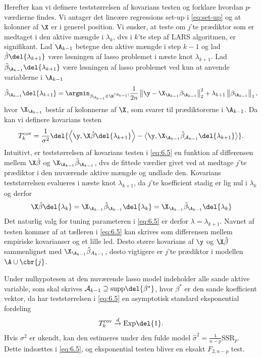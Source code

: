 Herefter kan vi definere teststørrelsen af kovarians testen og forklare hvordan \(p\)-værdierne findes.
Vi antager det lineære regressions set-up i \eqref{eq:set-up} og at kolonner af \(\X\) er i generel position.
Vi ønsker, at teste om \(j\)'te prædiktor som er medtaget i den aktive mængde i \(\lambda_k\), dvs i \(k\)'te step af LARS algoritmen, er signifikant.
Lad \(\A_{k-1}\) betegne den aktive mængde i step \(k-1\) og lad \(\hat{\beta} \del{\lambda_{k+1}}\) være løsningen af lasso problemet i næste knot \(\lambda_{k+1}\).
Lad \(\tilde{\beta}_{\A_{k-1}} \del{\lambda_{k+1}}\) være løsningen af lasso problemet ved kun at anvende variablerne i \(\A_{k-1}\)
\begin{align*}
\tilde{\beta}_{\A_{k-1}} \del{\lambda_{k+1}} = \argmin_{\beta_{\A_{k-1}} \in \R^{\vert \A_{k-1} \vert}} \frac{1}{2n} \left\Vert \y - \X_{\A_{k-1}} \beta_{\A_{k-1}} \right\Vert_2^2 + \lambda_{k+1} \left\Vert \beta_{\A_{k-1}} \right\Vert_1,
\end{align*}
hvor \(\X_{\A_{k-1}}\) består af kolonnerne af \(\X\), som svarer til prædiktorerne i \(\A_{k-1}\).
Da kan vi definere kovarians testen
\begin{align}
T_k^\text{cov} = \frac{1}{\sigma^2} \del{ \left\langle \y, \X \hat{\beta} \del{\lambda_{k+1}} \right\rangle - \left\langle  \y, \X_{\A_{k-1}} \tilde{\beta}_{\mathcal{A}_{k-1}} \del{\lambda_{k+1}} \right\rangle}. \label{eq:6.5}
\end{align}
Intuitivt, er teststørrelsen af kovarians testen i \eqref{eq:6.5} en funktion af differensen mellem \(\X \hat{\beta}\) og \(\X_{\A_{k-1}} \tilde{\beta}_{\A_{k-1}}\), dvs de fittede værdier givet ved at medtage \(j\)'te prædiktor i den nuværende aktive mængde og undlade den.
Kovarians teststørrelsen evalueres i næste knot \(\lambda_{k+1}\), da \(j\)'te koefficient stadig er lig nul i \(\lambda_k\) og derfor
\begin{align*}
\X \hat{\beta} \del{\lambda_k} = \X_{\A_{k-1}} \hat{\beta}_{\A_{k-1}} \del{\lambda_k} = \X_{\A_{k-1}} \tilde{\beta}_{\A_{k-1}} \del{\lambda_k}
\end{align*}
Det naturlig valg for tuning parameteren i \eqref{eq:6.5} er derfor \(\lambda= \lambda_{k+1}\).
Navnet af testen kommer af at tælleren i \eqref{eq:6.5} kan skrives som differensen mellem empiriske kovarianser og et lille led.
Desto større kovarians af \(\y\) og \(\X \hat{\beta}\) sammenlignet med \(\X_{\A_{k-1}} \hat{\beta}_{A_{k-1}}\), desto vigtigere er \(j\)'te prædiktor i modellen \(\A \cup \cbr{j}\).

Under nulhypotesen at den nuværende lasso model indeholder alle sande aktive variable, som skal skrives \(\mathcal{A}_{k-1} \supseteq \text{supp} \del{\beta^*}\), hvor \(\beta^*\) er den sande koefficient vektor, da har teststørrelsen i \eqref{eq:6.5} en asymptotisk standard eksponential fordeling
\begin{align*}
T_k^\text{cov} \overset{d}{\rightarrow} \text{Exp}\del{1}.
\end{align*}
Hvis \(\sigma^2\) er ukendt, kan den estimeres under den fulde model \(\hat{\sigma}^2 = \frac{1}{n-p} \text{SSR}_p\). 
Dette indsættes i \eqref{eq:6.5}, og eksponential testen bliver en eksakt \(F_{2,n-p}\) test.

